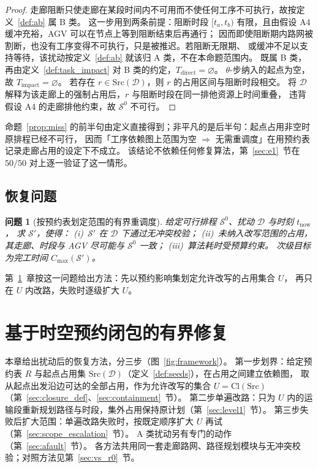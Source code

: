 \documentclass[manuscript,screen,review]{acmart}
\newcommand{\NPairs}{50}
\newcommand{\PassMiss}{\NPairs/\NPairs}      %
\newtheorem{problem}{问题}
\begin{document}
\begin{proof}
走廊阻断只使走廊在某段时间内不可用而不使任何工序不可执行，故按定义~\ref{def:ab} 属 B 类。
这一步用到两条前提：阻断时段 \([t_a,t_b)\) 有限，且由假设 A4 缓冲充裕，AGV 可以在节点上等到阻断结束后再通行；
因而即使阻断期内路网被割断，也没有工序变得不可执行，只是被推迟。若阻断无限期、
或缓冲不足以支持等待，该扰动按定义~\ref{def:ab} 就该归 A 类，不在本命题范围内。
既属 B 类，
再由定义~\ref{def:task_impact} 对 B 类的约定，\(T_{\mathrm{direct}}=\varnothing\)。
\(\theta\)-步纳入的起点为空，故 \(T_{\mathrm{impact}}=\varnothing\)。
若存在 \(r\in\mathrm{Src}(\mathcal{D})\)，则 \(r\) 的占用区间与阻断时段相交。
将 \(\mathcal{D}\) 解释为该走廊上的强制占用后，\(r\) 与阻断时段在同一排他资源上时间重叠，
违背假设 A4 的走廊排他约束，故 \(\mathcal{S}^0\) 不可行。
\end{proof}

命题~\ref{prop:miss} 的前半句由定义直接得到；非平凡的是后半句：起点占用非空时原排程已经不可行，
因而「工序依赖图上范围为空 \(\Rightarrow\) 无需重调度」在用预约表记录走廊占用的设定下不成立。
该结论不依赖任何修复算法，第~\ref{sec:e1}~节在 \(\PassMiss\) 对上逐一验证了这一情形。

\subsection{恢复问题}
\label{sec:recovery_problem}

\begin{problem}[按预约表划定范围的有界重调度]
\label{prob:recovery}
给定可行排程 \(\mathcal{S}^0\)、扰动 \(\mathcal{D}\) 与时刻 \(t_{\mathrm{now}}\)，
求 \(\mathcal{S}'\)，使得：
(i)~\(\mathcal{S}'\) 在 \(\mathcal{D}\) 下通过无冲突校验；
(ii)~未纳入改写范围的占用，其走廊、时段与 AGV 尽可能与 \(\mathcal{S}^0\) 一致；
(iii)~算法耗时受预算约束。
次级目标为完工时间 \(C_{\max}(\mathcal{S}')\)。
\end{problem}

第~\ref{sec:strc}~章按这一问题给出方法：先以预约影响集划定允许改写的占用集合 \(U\)，
再只在 \(U\) 内改路，失败时逐级扩大 \(U\)。

\section{基于时空预约闭包的有界修复}
\label{sec:strc}
\label{sec:repair}

本章给出扰动后的恢复方法，分三步（图~\ref{fig:framework}）。
第一步划界：给定预约表 \(R\) 与起点占用集 \(\mathrm{Src}(\mathcal{D})\)（定义~\ref{def:seeds}），在占用之间建立依赖图，
取从起点出发沿边可达的全部占用，作为允许改写的集合 \(U=\mathrm{Cl}(\mathrm{Src})\)（第~\ref{sec:closure_def}、\ref{sec:containment}~节）。
第二步单遍改路：只为 \(U\) 内的运输段重新规划路径与时段，集外占用保持原计划（第~\ref{sec:level1}~节）。
第三步失败后扩大范围：单遍改路失败时，按既定顺序扩大 \(U\) 再试（第~\ref{sec:scope_escalation}~节）。
A 类扰动另有专门的动作（第~\ref{sec:afault}~节）。
各方法共用同一套走廊路网、路径规划模块与无冲突校验；对照方法见第~\ref{sec:vs_r0}~节。
\end{document}

